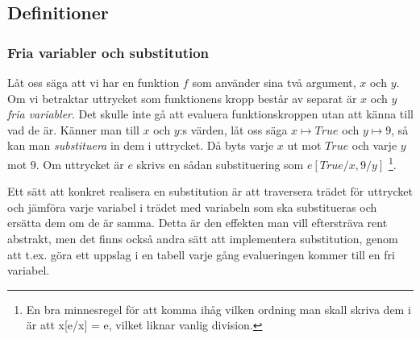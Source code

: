 \documentclass[Rapport]{subfiles}
\begin{document}
\subsection{Definitioner}

\subsubsection{Fria variabler och substitution}
Låt oss säga att vi har en funktion $f$ som använder sina två 
argument, $x$ och $y$. Om vi betraktar uttrycket som funktionens 
kropp består av separat är $x$ och $y$ 
\emph{fria variabler}. Det skulle inte gå att evaluera funktionskroppen utan
att känna till vad de är. Känner man till $x$ och $y$:s värden, låt oss säga
$x \mapsto True$ och $y \mapsto 9$, så kan man \emph{substituera} in dem i uttrycket. Då byts varje
$x$ ut mot $True$ och varje $y$ mot $9$. Om uttrycket är $e$ skrivs en sådan substituering som $e[True/x, 9/y]$
\footnote{En bra minnesregel för att komma ihåg vilken ordning man skall skriva dem i är att x[e/x] = e, vilket liknar vanlig division.}. 

    Ett sätt att konkret realisera en substitution är att traversera trädet
för uttrycket och jämföra varje variabel i trädet med variabeln som ska substitueras och ersätta dem
om de är samma. Detta är den effekten man vill eftersträva rent abstrakt,
men det finns också andra sätt att implementera substitution, genom
att t.ex. göra ett uppslag i en tabell varje gång evalueringen kommer till en fri variabel. 
\end{document}
